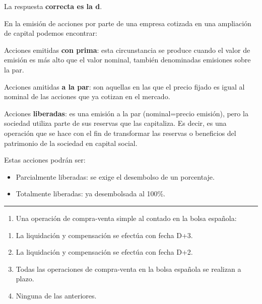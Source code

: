 \documentclass[
  letterpaper,
  DIV=11,
  numbers=noendperiod]{scrreprt}
\providecommand{\tightlist}{%
  \setlength{\itemsep}{0pt}\setlength{\parskip}{0pt}}\usepackage{longtable,booktabs,array}
\begin{document}
\begin{tcolorbox}[enhanced jigsaw, left=2mm, opacityback=0, colback=white, breakable, arc=.35mm, bottomrule=.15mm, rightrule=.15mm, toprule=.15mm, leftrule=.75mm, colframe=quarto-callout-tip-color-frame]
\begin{minipage}[t]{5.5mm}
\textcolor{quarto-callout-tip-color}{\faLightbulb}
\end{minipage}%
\begin{minipage}[t]{\textwidth - 5.5mm}

La respuesta \textbf{correcta es la d}.

En la emisión de acciones por parte de una empresa cotizada en una
ampliación de capital podemos encontrar:

Acciones emitidas \textbf{con prima}: esta circunstancia se produce
cuando el valor de emisión es más alto que el valor nominal, también
denominadas emisiones sobre la par.

Acciones amitidas \textbf{a la par}: son aquellas en las que el precio
fijado es igual al nominal de las acciones que ya cotizan en el mercado.

Acciones \textbf{liberadas}: es una emisión a la par (nominal=precio
emisión), pero la sociedad utiliza parte de sus reservas que las
capitaliza. Es decir, es una operación que se hace con el fin de
transformar las reservas o beneficios del patrimonio de la sociedad en
capital social.

Estas acciones podrán ser:

\begin{itemize}
\item
  Parcialmente liberadas: se exige el desembolso de un porcentaje.
\item
  Totalmente liberadas: ya desembolsada al 100\%.
\end{itemize}

\end{minipage}%
\end{tcolorbox}

\begin{center}\rule{0.5\linewidth}{0.5pt}\end{center}

\begin{enumerate}
\def\labelenumi{\arabic{enumi}.}
\setcounter{enumi}{48}
\tightlist
\item
  Una operación de compra-venta simple al contado en la bolsa española:
\end{enumerate}

\begin{enumerate}
\def\labelenumi{\alph{enumi})}
\item
  La liquidación y compensación se efectúa con fecha D+3.
\item
  La liquidación y compensación se efectúa con fecha D+2.
\item
  Todas las operaciones de compra-venta en la bolsa española se realizan
  a plazo.
\item
  Ninguna de las anteriores.
\end{enumerate}
\end{document}
